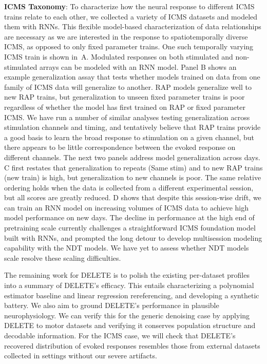 \documentclass[12pt,oneside]{report}
\begin{document}
\textbf{ICMS Taxonomy}: To characterize how the neural response to different ICMS trains relate to each other, we collected a variety of ICMS datasets and modeled them with RNNs. This flexible model-based characterization of data relationships are necessary as we are interested in the response to spatiotemporally diverse ICMS, as opposed to only fixed parameter trains. One such temporally varying ICMS train is shown in~A. Modulated responses on both stimulated and non-stimulated arrays can be modeled with an RNN model. Panel B shows an example generalization assay that tests whether models trained on data from one family of ICMS data will generalize to another. RAP models generalize well to new RAP trains, but generalization to unseen fixed parameter trains is poor regardless of whether the model has first trained on RAP or fixed parameter ICMS. We have run a number of similar analyses testing generalization across stimulation channels and timing, and tentatively believe that RAP trains provide a good basis to learn the broad response to stimulation on a given channel, but there appears to be little correspondence between the evoked response on different channels. The next two panels address model generalization across days. C first restates that generalization to repeats (Same stim) and to new RAP trains (new train) is high, but generalization to new channels is poor. The same relative ordering holds when the data is collected from a different experimental session, but all scores are greatly reduced. D shows that despite this session-wise drift, we can train an RNN model on increasing volumes of ICMS data to achieve high model performance on new days. The decline in performance at the high end of pretraining scale currently challenges a straightforward ICMS foundation model built with RNNs, and prompted the long detour to develop multisession modeling capability with the NDT models. We have yet to assess whether NDT models scale resolve these scaling difficulties.

The remaining work for DELETE is to polish the existing per-dataset profiles into a summary of DELETE’s efficacy. This entails characterizing a polynomial estimator baseline and linear regression rereferencing, and developing a synthetic battery. We also aim to ground DELETE’s performance in plausible neurophysiology. We can verify this for the generic denoising case by applying DELETE to motor datasets and verifying it conserves population structure and decodable information. For the ICMS case, we will check that DELETE’s recovered distribution of evoked responses resembles those from external datasets collected in settings without our severe artifacts.
\end{document}
